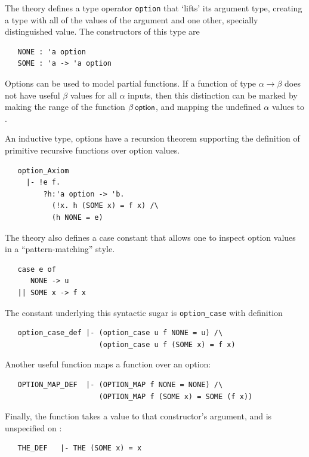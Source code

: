 The theory  defines a type operator \verb+option+
that `lifts' its argument type, creating a type with all of the
values of the argument and one other, specially distinguished value.
The constructors of this type are
\begin{hol}
\begin{verbatim}
   NONE : 'a option
   SOME : 'a -> 'a option
\end{verbatim}
\end{hol}
Options can be used to model partial functions.  If a function of type
$\alpha\rightarrow\beta$ does not have useful $\beta$ values for all
$\alpha$ inputs, then this distinction can be marked by making the
range of the function $\beta\,\mbox{\small{\textbf{\sf{option}}}}$, and mapping the
undefined $\alpha$ values to .

An inductive type, options have a recursion theorem supporting the
definition of primitive recursive functions over option values.
%
\begin{hol}
\begin{verbatim}
   option_Axiom
     |- !e f.
         ?h:'a option -> 'b.
           (!x. h (SOME x) = f x) /\
           (h NONE = e)
\end{verbatim}
\end{hol}
The  theory also defines a case constant that allows
one to inspect option values in a ``pattern-matching'' style.
\begin{hol}
\begin{verbatim}
   case e of
      NONE -> u
   || SOME x -> f x
\end{verbatim}
\end{hol}
%
The constant underlying this syntactic sugar is \verb+option_case+
with definition
\begin{hol}
\begin{verbatim}
   option_case_def |- (option_case u f NONE = u) /\
                      (option_case u f (SOME x) = f x)
\end{verbatim}
\end{hol}
%
Another useful function maps a function over an option:
%
\begin{hol}
\begin{verbatim}
   OPTION_MAP_DEF  |- (OPTION_MAP f NONE = NONE) /\
                      (OPTION_MAP f (SOME x) = SOME (f x))
\end{verbatim}
\end{hol}
Finally, the \holtxt{THE} function takes a \holtxt{SOME}
value to that constructor's argument, and is unspecified on
:
\begin{hol}
\begin{verbatim}
   THE_DEF   |- THE (SOME x) = x
\end{verbatim}
\end{hol}

